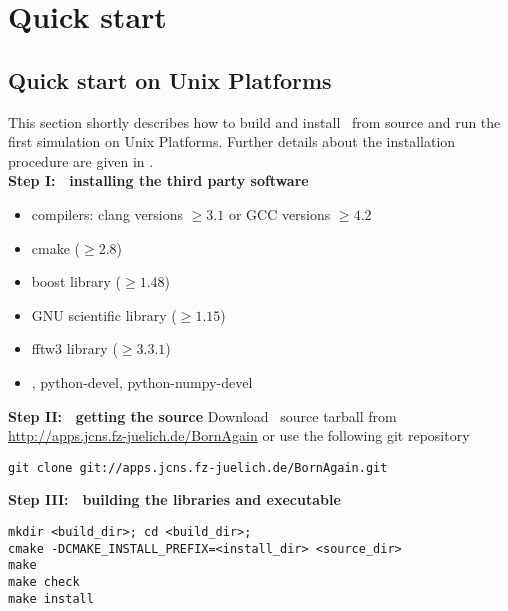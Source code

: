 \newpage
\chapter{Quick start} 

\section{Quick start on Unix Platforms}

This section shortly describes how to build and install \BornAgain\ 
from source and run the first simulation on Unix Platforms. 
Further details about the installation procedure are given in . \\

\noindent
{\bf Step I: $~$ installing the third party software}
\begin{itemize}
\item compilers: clang  versions $\geq 3.1$ or GCC versions $\geq 4.2$
\item cmake ($\geq 2.8$)
\item boost library ($\geq 1.48$)
\item GNU scientific library ($\geq 1.15$)
\item fftw3 library ($\geq 3.3.1$)
\item {}, python-devel, python-numpy-devel
\end{itemize}
\vspace*{2mm}


\noindent
{\bf Step II: $~$ getting the source} \newline
Download \BornAgain\ source tarball from \url{http://apps.jcns.fz-juelich.de/BornAgain}
or use the following git repository
\begin{lstlisting}[language=shell, style=commandline]
git clone git://apps.jcns.fz-juelich.de/BornAgain.git 
\end{lstlisting}

\vspace*{3mm}



\noindent
{\bf Step III: $~$ building the libraries and executable}
\begin{lstlisting}[language=shell, style=commandline]
mkdir <build_dir>; cd <build_dir>;
cmake -DCMAKE_INSTALL_PREFIX=<install_dir> <source_dir>
make
make check
make install
\end{lstlisting}
\vspace*{3mm}


